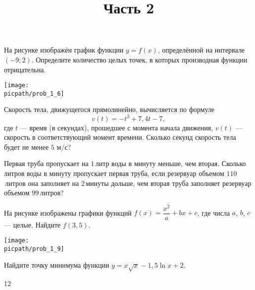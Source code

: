 \begin{training}[3]
\begin{listofex}
		На рисунке изображён график функции \( y = f(x) \), определённой на
		интервале \( (-9; 2) \). Определите количество целых точек, в которых производная функции отрицательна.
		\begin{center}
			\texttt{[image: \\picpath/prob\_1\_6]}
		\end{center}
		\foranswer
		\item Скорость тела, движущегося прямолинейно, вычисляется по формуле
		\[ v(t) = -t^2+7,4t-7, \]
		где \( t \) --- время (в секундах), прошедшее с момента начала движения,
		\( v(t) \) --- скорость в соответствующий момент времени.
		Сколько секунд скорость тела будет не менее \( 5 \) м/с?
		\foranswer
		\item Первая труба пропускает на \( 1 \) литр воды в минуту меньше, чем вторая.
		Сколько литров воды в минуту пропускает первая труба, если резервуар объемом \( 110 \) литров она заполняет на \( 2 \) минуты дольше,
		чем вторая труба заполняет резервуар объемом \( 99 \) литров?
		\foranswer
		\newpage
		\hphantom{Часть 1}
		\item 
		На рисунке изображены графики функций \( f(x) = \dfrac{x^2}{a}+bx+c \), где числа
		\( a \), \( b \), \( c \) --- целые. Найдите \( f(3,5) \).
		\begin{center}
			\texttt{[image: \\picpath/prob\_1\_9]}
		\end{center}
		\foranswer
		\item Найдите точку минимума функции \( y=x\sqrt{x}-1,5\ln x + 2 \).
		\foranswer
		\egepreambtwo
		\title{Часть 2}
		\item 12
	\end{listofex}
\end{training}
